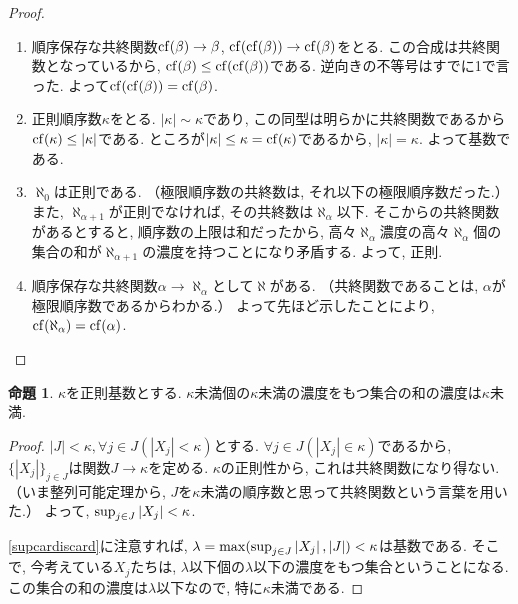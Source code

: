 \documentclass[a4paper, twoside]{bxjsarticle}
\newcommand{\abs}[1]{\left\lvert#1\right\rvert}
\theoremstyle{definition}
\newtheorem{prop}[thm]{命題}
\begin{document}
\begin{proof}
\begin{enumerate}
                \item 順序保存な共終関数${\rm cf}(\beta)\to\beta$, ${\rm cf}({\rm cf}(\beta))\to{\rm cf}(\beta)$をとる. この合成は共終関数となっているから, ${\rm cf}(\beta)\leq{\rm cf}({\rm cf}(\beta))$である. 逆向きの不等号はすでに1で言った. よって${\rm cf}({\rm cf}(\beta))={\rm cf}(\beta)$.
                
                \item 正則順序数$\kappa$をとる. $\abs{\kappa}\sim\kappa$であり, この同型は明らかに共終関数であるから${\rm cf}(\kappa)\leq\abs{\kappa}$である. ところが$\abs{\kappa}\leq\kappa={\rm cf}(\kappa)$であるから, $\abs{\kappa}=\kappa$. よって基数である.
                
                \item $\aleph_0$は正則である. （極限順序数の共終数は, それ以下の極限順序数だった.）また, $\aleph_{\alpha+1}$が正則でなければ, その共終数は$\aleph_\alpha$以下. そこからの共終関数があるとすると, 順序数の上限は和だったから, 高々$\aleph_\alpha$濃度の高々$\aleph_\alpha$個の集合の和が$\aleph_{\alpha+1}$の濃度を持つことになり矛盾する. よって, 正則.
                
                \item 順序保存な共終関数$\alpha\to\aleph_\alpha$として$\aleph$がある. （共終関数であることは, $\alpha$が極限順序数であるからわかる.） よって先ほど示したことにより, ${\rm cf}(\aleph_\alpha)={\rm cf}(\alpha)$.
        \end{enumerate}
        \end{proof}
        \begin{prop}
            $\kappa$を正則基数とする. $\kappa$未満個の$\kappa$未満の濃度をもつ集合の和の濃度は$\kappa$未満.
        \end{prop}
        \begin{proof}
            $\abs{J}<\kappa, \forall j\in J(\abs{X_j}<\kappa)$とする.  $\forall j\in J(\abs{X_j}\in\kappa)$であるから, $\{\abs{X_j}\}_{j\in J}$は関数$J\to \kappa$を定める. $\kappa$の正則性から, これは共終関数になり得ない. （いま整列可能定理から, $J$を$\kappa$未満の順序数と思って共終関数という言葉を用いた.） よって, ${\rm sup}_{j\in J}\abs{X_j}<\kappa$.
            
           \ref{supcardiscard}に注意すれば, $\lambda = {\rm max}({\rm sup}_{j\in J}\abs{X_j}, \abs{J}) < \kappa$は基数である. そこで, 今考えている$X_j$たちは, $\lambda$以下個の$\lambda$以下の濃度をもつ集合ということになる. この集合の和の濃度は$\lambda$以下なので, 特に$\kappa$未満である.
        \end{proof}
\end{document}
